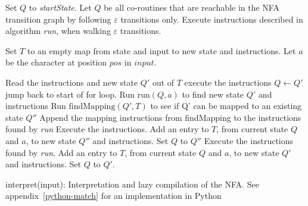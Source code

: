 \documentclass[11pt,a4paper,twoside,openright]{Thesis}
\theoremstyle{definition}
\begin{document}
\begin{algorithm*}[htpb]
\begin{algorithmic}[1]

\State Set $Q$ to \emph{startState}.
\State Let $Q$ be all co-routines that are reachable in the NFA transition graph by following $\varepsilon$ transitions only.
\State Execute instructions described in algorithm \emph{run}, when walking $\varepsilon$ transitions.

\State Set $T$ to an empty map from state and input to new state and instructions.
	\State Let $a$ be the character at position $pos$ in $input$.

		\State Read the instructions and new state $Q'$ out of $T$
		\State execute the instructions
		\State $Q\leftarrow Q'$
		\State jump back to start of for loop.
	\Else
		\State Run $\mbox{run}(Q,a)$ to find new state $Q'$ and instructions
		\State Run $\mbox{findMapping}(Q', T)$ to see if Q' can be mapped to an existing state $Q''$
    \State Append the mapping instructions from findMapping to the instructions found by \emph{run}\;
			\State Execute the instructions.
			\State Add an entry to $T$, from current state $Q$ and $a$, to new state $Q''$ and instructions.
			\State Set $Q$ to $Q''$
		\Else
      \State Execute the instructions found by \emph{run}.
			\State Add an entry to $T$, from current state $Q$ and $a$, to new state $Q'$ and instructions.
			\State Set $Q$ to $Q'$.
		\EndIf
	\EndIf
\EndFor
\end{algorithmic}
\caption{interpret(input): Interpretation and lazy compilation of the NFA. 
  See appendix~\ref{python-match} for an implementation in Python}
\label{interpret}
\end{algorithm*}
\end{document}
